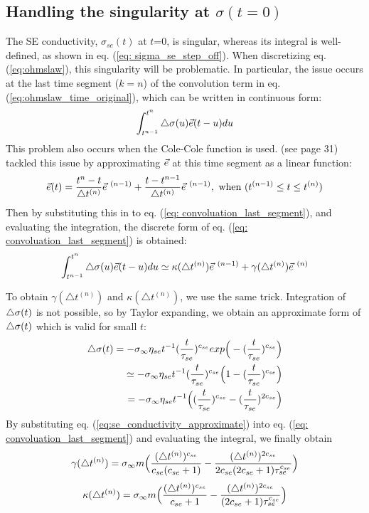 \subsection{Handling the singularity at $\sigma(t=0)$}
\label{app: Handling singularity}
The SE conductivity, $\sigma_{se}(t)$ at $t$=0, is singular, whereas its integral is well-defined, as shown in eq. (\ref{eq: sigma_se_step_off}). When discretizing eq. (\ref{eq:ohmslaw}), this singularity will be problematic. In particular, the issue occurs at the last time segment ($k=n$) of the convolution term in eq. (\ref{eq:ohmslaw_time_original}), which can be written in continuous form:
\begin{equation}
  \int_{t^{n-1}}^{t^{n}} \triangle\sigma(u) {\vec e}(t-u) du
  \label{eq: convoluation_last_segment}
\end{equation}
This problem also occurs when the Cole-Cole function is used. \cite{marchant2015} (see page 31) tackled this issue by approximating ${\vec e}$ at this time segment as a linear function:
\begin{equation}
  \e(t) = \frac{t^{n}-t}{\triangle t^{(n)}} \e^{ \ (n-1)} + \frac{t-t^{n-1}}{\triangle t^{(n)}} \e^{ \ (n-1)}, \ \text{when} \ (t^{(n-1)}\leq t \leq t^{(n)})
\end{equation}
Then by substituting this in to eq. (\ref{eq: convoluation_last_segment}), and evaluating the integration, the discrete form of eq. (\ref{eq: convoluation_last_segment}) is obtained:
\begin{equation}
  \int_{t^{n-1}}^{t^{n}} \triangle\sigma(u) {\vec e}(t-u) du \simeq
  \kappa(\triangle t^{(n)}) {\vec e}^{\ (n-1)} + \gamma(\triangle t^{(n)}) {\vec e}^{\ (n)}
\end{equation}

To obtain $\gamma(\triangle t^{(n)})$ and $\kappa(\triangle t^{(n)})$, we use the same trick. Integration of $\triangle\sigma(t)$ is not possible, so by Taylor expanding, we obtain an approximate form of $\triangle\sigma(t)$ which is valid for small $t$:
\begin{align}
  \triangle\sigma (t) = -\sigma_\infty \eta_{se}t^{-1}(\frac{t}{\tau_{se}})^{c_{se}}exp\Big(-(\frac{t}{\tau_{se}})^{c_{se}}\Big) \nonumber \\
  \simeq -\sigma_\infty \eta_{se}t^{-1}(\frac{t}{\tau_{se}})^{c_{se}}\Big(1-(\frac{t}{\tau_{se}})^{c_{se}}\Big) \nonumber  \\
  = -\sigma_\infty \eta_{se}t^{-1}\Big((\frac{t}{\tau_{se}})^{c_{se}}-(\frac{t}{\tau_{se}})^{2c_{se}}\Big)
  \label{eq:se_conductivity_approximate}
\end{align}
By substituting eq. (\ref{eq:se_conductivity_approximate}) into eq. (\ref{eq: convoluation_last_segment}) and evaluating the integral, we finally obtain
\begin{equation}
  \gamma(\triangle t^{(n)}) = \sigma_\infty m \Big( \frac{(\triangle t^{(n)})^{c_{se}}}{c_{se}(c_{se}+1)}-
  \frac{(\triangle t^{(n)})^{2c_{se}}}{2c_{se}(2c_{se}+1)\tau_{se}^{c_{se}}} \Big)
\end{equation}
\begin{equation}
  \kappa(\triangle t^{(n)}) = \sigma_\infty m \Big( \frac{(\triangle t^{(n)})^{c_{se}}}{c_{se}+1}-
  \frac{(\triangle t^{(n)})^{2c_{se}}}{(2c_{se}+1)\tau_{se}^{c_{se}}} \Big)
\end{equation}

